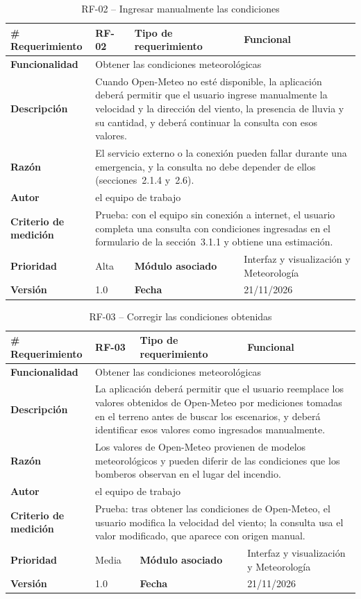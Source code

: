 \begin{longtable}{|p{\rqA}|p{\rqB}|p{\rqC}|p{\rqD}|}
  \caption{RF-02 -- Ingresar manualmente las condiciones}\label{tab:rf-02}\tabularnewline
  \hline
  \textbf{\# Requerimiento} & RF-02 & \raggedright\textbf{Tipo de requerimiento} & Funcional\tabularnewline\hline
  \raggedright\textbf{Funcionalidad} & \multicolumn{3}{p{\rqBCD}|}{Obtener las condiciones meteorológicas}\tabularnewline\hline
  \endfirsthead
  \textbf{Descripción} & \multicolumn{3}{p{\rqBCD}|}{Cuando Open-Meteo no esté disponible, la aplicación deberá permitir que el usuario ingrese manualmente la velocidad y la dirección del viento, la presencia de lluvia y su cantidad, y deberá continuar la consulta con esos valores.}\tabularnewline\hline
  \textbf{Razón} & \multicolumn{3}{p{\rqBCD}|}{El servicio externo o la conexión pueden fallar durante una emergencia, y la consulta no debe depender de ellos (secciones~2.1.4 y~2.6).}\tabularnewline\hline
  \textbf{Autor} & \multicolumn{3}{p{\rqBCD}|}{el equipo de trabajo}\tabularnewline\hline
  \raggedright\textbf{Criterio de medición} & \multicolumn{3}{p{\rqBCD}|}{Prueba: con el equipo sin conexión a internet, el usuario completa una consulta con condiciones ingresadas en el formulario de la sección~3.1.1 y obtiene una estimación.}\tabularnewline\hline
  \textbf{Prioridad} & Alta & \raggedright\textbf{Módulo asociado} & Interfaz y visualización y Meteorología\tabularnewline\hline
  \textbf{Versión} & 1.0 & \textbf{Fecha} & 21/11/2026\tabularnewline\hline
\end{longtable}

\begin{longtable}{|p{\rqA}|p{\rqB}|p{\rqC}|p{\rqD}|}
  \caption{RF-03 -- Corregir las condiciones obtenidas}\label{tab:rf-03}\tabularnewline
  \hline
  \textbf{\# Requerimiento} & RF-03 & \raggedright\textbf{Tipo de requerimiento} & Funcional\tabularnewline\hline
  \raggedright\textbf{Funcionalidad} & \multicolumn{3}{p{\rqBCD}|}{Obtener las condiciones meteorológicas}\tabularnewline\hline
  \endfirsthead
  \textbf{Descripción} & \multicolumn{3}{p{\rqBCD}|}{La aplicación deberá permitir que el usuario reemplace los valores obtenidos de Open-Meteo por mediciones tomadas en el terreno antes de buscar los escenarios, y deberá identificar esos valores como ingresados manualmente.}\tabularnewline\hline
  \textbf{Razón} & \multicolumn{3}{p{\rqBCD}|}{Los valores de Open-Meteo provienen de modelos meteorológicos y pueden diferir de las condiciones que los bomberos observan en el lugar del incendio.}\tabularnewline\hline
  \textbf{Autor} & \multicolumn{3}{p{\rqBCD}|}{el equipo de trabajo}\tabularnewline\hline
  \raggedright\textbf{Criterio de medición} & \multicolumn{3}{p{\rqBCD}|}{Prueba: tras obtener las condiciones de Open-Meteo, el usuario modifica la velocidad del viento; la consulta usa el valor modificado, que aparece con origen manual.}\tabularnewline\hline
  \textbf{Prioridad} & Media & \raggedright\textbf{Módulo asociado} & Interfaz y visualización y Meteorología\tabularnewline\hline
  \textbf{Versión} & 1.0 & \textbf{Fecha} & 21/11/2026\tabularnewline\hline
\end{longtable}

